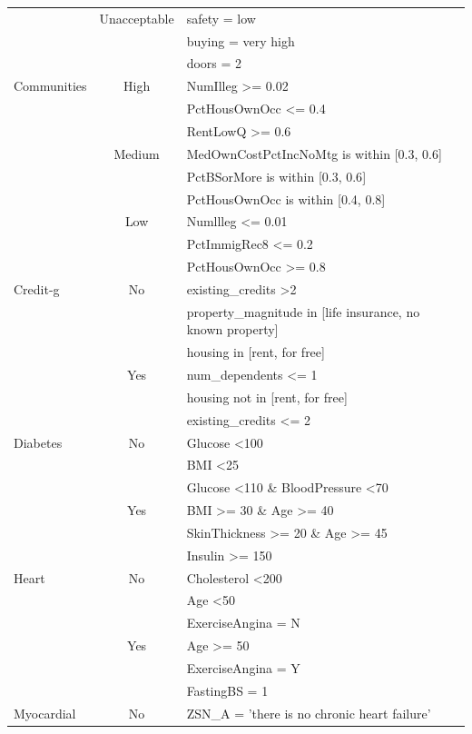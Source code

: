 \documentclass{article}
\theoremstyle{plain}
\theoremstyle{definition}
\theoremstyle{remark}
\begin{document}
{\begin{longtable}{lcl}
 & Unacceptable & safety = low \\
 &  & buying = very high \\
 &  & doors = 2 \\ \midrule
Communities & High & NumIlleg \textgreater{}= 0.02 \\
 &  & PctHousOwnOcc \textless{}= 0.4 \\
 &  & RentLowQ \textgreater{}= 0.6 \\
 & Medium & MedOwnCostPctIncNoMtg is within {[}0.3, 0.6{]} \\
 &  & PctBSorMore is within {[}0.3, 0.6{]} \\
 &  & PctHousOwnOcc is within {[}0.4, 0.8{]} \\
 & Low & Numllleg \textless{}= 0.01 \\
 &  & PctImmigRec8 \textless{}= 0.2 \\
 &  & PctHousOwnOcc \textgreater{}= 0.8 \\ \midrule 
Credit-g & No & existing\_credits \textgreater 2 \\
 &  & property\_magnitude in {[}life insurance, no known property{]} \\
 &  & housing in {[}rent, for free{]} \\
 & Yes & num\_dependents \textless{}= 1 \\
 &  & housing not in {[}rent, for free{]} \\
 &  & existing\_credits \textless{}= 2 \\ \midrule
Diabetes & No & Glucose \textless 100 \\
 &  & BMI \textless 25 \\
 &  & Glucose \textless 110 \& BloodPressure \textless 70 \\
 & Yes & BMI \textgreater{}= 30 \& Age \textgreater{}= 40 \\
 &  & SkinThickness \textgreater{}= 20 \& Age \textgreater{}= 45 \\
 &  & Insulin \textgreater{}= 150 \\ \midrule
Heart & No & Cholesterol \textless 200 \\
 &  & Age \textless 50 \\
 &  & ExerciseAngina = N \\
 & Yes & Age \textgreater{}= 50 \\
 &  & ExerciseAngina = Y \\
 &  & FastingBS = 1 \\ \midrule
Myocardial & No & ZSN\_A = 'there is no chronic heart failure' \\

\end{longtable}}
\end{document}

